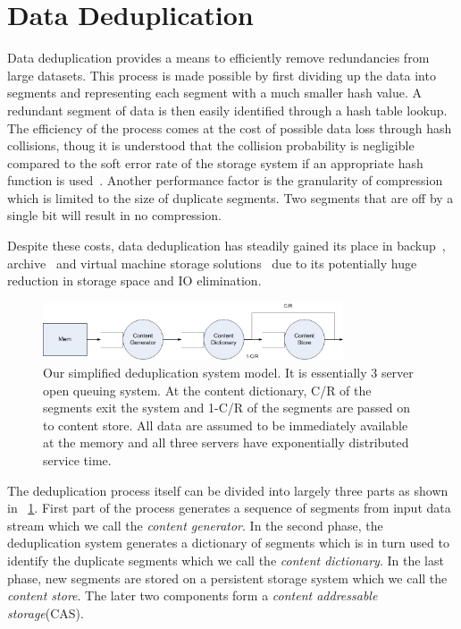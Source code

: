 \section{Data Deduplication}
\label{DD}

Data deduplication provides a means to efficiently remove redundancies from large datasets.
This process is made possible by first dividing up the data into segments and representing each segment with a much smaller hash value.
A redundant segment of data is then easily identified through a hash table lookup.
The efficiency of the process comes at the cost of possible data loss through hash collisions, thoug it is understood that the collision probability is negligible compared to the soft error rate of the storage system if an appropriate hash function is used~\cite{aronovich:2009, zhu:2008, bobbarjung:2006, muthitacharoen:2001}.
Another performance factor is the granularity of compression which is limited to the size of duplicate segments.
Two segments that are off by a single bit will result in no compression.

Despite these costs, data deduplication has steadily gained its place in backup~\cite{meister:2009, lillibridge:2009, zhu:2008}, archive~\cite{you:2005} and virtual machine storage solutions~\cite{smith:2008, jin:2009, clements:2009} due to its potentially huge reduction in storage space and IO elimination.

\begin{figure}[!t]
\centering
\includegraphics[width=3.5in]{figure/dedup/queue}
\caption{Our simplified deduplication system model. It is essentially 3 server open queuing system. At the content dictionary, C/R of the segments exit the system and 1-C/R of the segments are passed on to content store. All data are assumed to be immediately available at the memory and all three servers have exponentially distributed service time.}
\label{queue}
\end{figure}

The deduplication process itself can be divided into largely three parts as shown in \figurename~\ref{queue}. First part of the process generates a sequence of segments from input data stream which we call the \emph{content generator}. In the second phase, the deduplication system generates a dictionary of segments which is in turn used to identify the duplicate segments which we call the \emph{content dictionary}. In the last phase, new segments are stored on a persistent storage system which we call the \emph{content store}. The later two components form a \emph{content addressable storage}(CAS).

